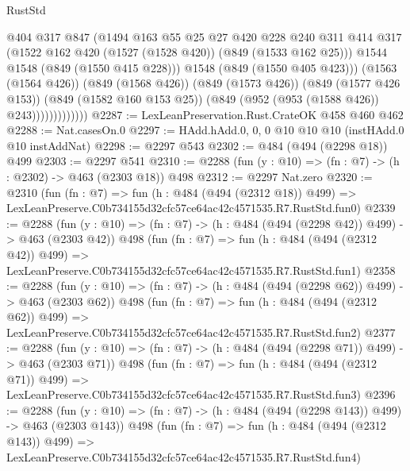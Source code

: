 \begin{lexlean}{RustStd}
\begin{coremodule}
                            @404
                            @317
                            @847
                            (@1494
                              @163
                              @55
                              @25
                              @27
                              @420
                              @228
                              @240
                              @311
                              @414
                              @317
                              (@1522 @162 @420 (@1527 (@1528 @420)) (@849 (@1533 @162 @25)))
                              @1544
                              @1548
                              (@849 (@1550 @415 @228)))
                            @1548
                            (@849 (@1550 @405 @423)))
                          (@1563 (@1564 @426))
                          (@849 (@1568 @426))
                          (@849 (@1573 @426))
                          (@849 (@1577 @426 @153))
                          (@849 (@1582 @160 @153 @25))
                          (@849 (@952 (@953 (@1588 @426)) @243)))))))))))))
@2287 := LexLeanPreservation.Rust.CrateOK @458 @460 @462
@2288 := Nat.casesOn.{0}
@2297 := HAdd.hAdd.{0, 0, 0} @10 @10 @10 (instHAdd.{0} @10 instAddNat)
@2298 := @2297 @543
@2302 := @484 (@494 (@2298 @18)) @499
@2303 := @2297 @541
@2310 := @2288 (fun (y : @10) => (fn : @7) -> (h : @2302) -> @463 (@2303 @18)) @498
@2312 := @2297 Nat.zero
@2320 := @2310
    (fun (fn : @7) =>
    fun (h : @484 (@494 (@2312 @18)) @499) =>
    LexLeanPreserve.C0b734155d32cfc57ce64ac42c4571535.R7.RustStd.fun0)
@2339 := @2288
    (fun (y : @10) => (fn : @7) -> (h : @484 (@494 (@2298 @42)) @499) -> @463 (@2303 @42))
    @498
    (fun (fn : @7) =>
    fun (h : @484 (@494 (@2312 @42)) @499) =>
    LexLeanPreserve.C0b734155d32cfc57ce64ac42c4571535.R7.RustStd.fun1)
@2358 := @2288
    (fun (y : @10) => (fn : @7) -> (h : @484 (@494 (@2298 @62)) @499) -> @463 (@2303 @62))
    @498
    (fun (fn : @7) =>
    fun (h : @484 (@494 (@2312 @62)) @499) =>
    LexLeanPreserve.C0b734155d32cfc57ce64ac42c4571535.R7.RustStd.fun2)
@2377 := @2288
    (fun (y : @10) => (fn : @7) -> (h : @484 (@494 (@2298 @71)) @499) -> @463 (@2303 @71))
    @498
    (fun (fn : @7) =>
    fun (h : @484 (@494 (@2312 @71)) @499) =>
    LexLeanPreserve.C0b734155d32cfc57ce64ac42c4571535.R7.RustStd.fun3)
@2396 := @2288
    (fun (y : @10) => (fn : @7) -> (h : @484 (@494 (@2298 @143)) @499) -> @463 (@2303 @143))
    @498
    (fun (fn : @7) =>
    fun (h : @484 (@494 (@2312 @143)) @499) =>
    LexLeanPreserve.C0b734155d32cfc57ce64ac42c4571535.R7.RustStd.fun4)

\end{coremodule}
\end{lexlean}
